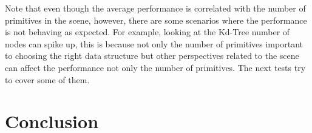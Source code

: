 \documentclass[11pt,a4paper]{article}
\begin{document}
Note that even though the average performance is correlated with the number of primitives in the scene, however, there are some scenarios where the performance is not behaving as expected. For example, looking at the Kd-Tree number of nodes can spike up, this is because not only the number of primitives important to choosing the right data structure but other perspectives related to the scene can affect the performance not only the number of primitives.  The next tests try to cover some of them.

\clearpage

\section{Conclusion}
\cite{pharr2016physically}
\cite{burley2018design}
\cite{stanfordlucy}

\clearpage



\end{document}
